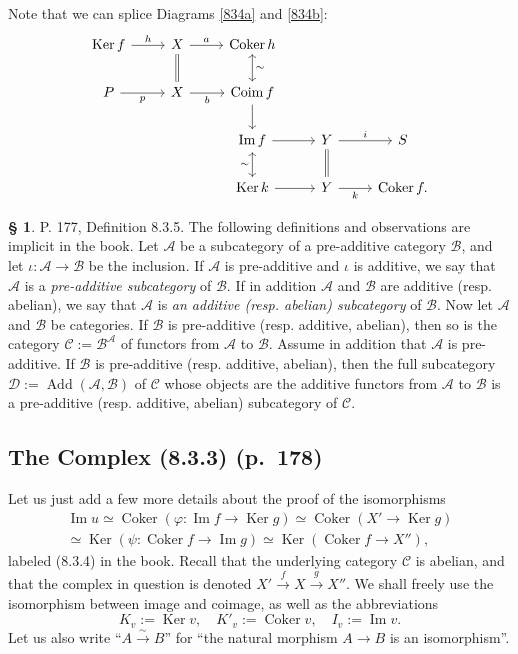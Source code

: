 \documentclass[12pt]{article}
\theoremstyle{remark}
\theoremstyle{definition}
\newtheorem{s}[thm]{\S}
\newcommand{\cc}{\mathcal}
\newcommand{\C}{\mathcal C}
\DeclareMathOperator{\Ad}{Add}
\DeclareMathOperator{\Coim}{Coim}
\DeclareMathOperator{\Coker}{Coker}
\DeclareMathOperator{\Ima}{Im}
\DeclareMathOperator{\Ker}{Ker}
\begin{document}
Note that we can splice Diagrams \eqref{834a} and \eqref{834b}:
$$
\begin{tikzcd}
\Ker f\ar{r}{h}&X\ar[equal]{d}\ar{r}{a}&\Coker h\ar[leftrightarrow]{d}{\sim}\\ 
P\ar{r}[swap]{p}&X\ar{r}[swap]{b}&\Coim f\ar{d}\\ 
{}&{}&\Ima f\ar[leftrightarrow]{d}[swap]{\sim}\ar{r}&Y\ar[equal]{d}\ar{r}{i}&S\\ 
{}&{}&\Ker k\ar{r}&Y\ar{r}[swap]{k}&\Coker f.
\end{tikzcd}
$$
%
%
\begin{s} 
P. 177, Definition 8.3.5. The following definitions and observations are implicit in the book. Let $\cc A$ be a subcategory of a pre-additive category $\cc B$, and let $\iota:\cc A\to \cc B$ be the inclusion. If $\cc A$ is pre-additive and $\iota$ is additive, we say that $\cc A$ is a {\em pre-additive subcategory} of $\cc B$. If in addition $\cc A$ and $\cc B$ are additive (resp. abelian), we say that $\cc A$ is {\em an additive (resp. abelian) subcategory} of $\cc B$. Now let $\cc A$ and $\cc B$ be categories. If $\cc B$ is pre-additive (resp. additive, abelian), then so is the category $\cc C:=\cc B^\cc A$ of functors from $\cc A$ to $\cc B$. Assume in addition that $\cc A$ is pre-additive. If $\cc B$ is pre-additive (resp. additive, abelian), then the full subcategory $\cc D:=\Ad(\cc A,\cc B)$ of $\cc C$ whose objects are the additive functors from $\cc A$ to $\cc B$ is a pre-additive (resp. additive, abelian) subcategory of $\cc C$.
\end{s}
%
\subsection{The Complex (8.3.3) (p.~178)}
%
Let us just add a few more details about the proof of the isomorphisms
\begin{equation}\label{834}
\begin{split}
\Ima u\simeq\Coker(\varphi:\Ima f\to\Ker g)\simeq\Coker(X'\to\Ker g)\\ 
\simeq\Ker(\psi:\Coker f\to\Ima g)\simeq\Ker(\Coker f\to X''),
\end{split}
\end{equation}
labeled (8.3.4) in the book. Recall that the underlying category $\C$ is abelian, and that the complex in question is denoted $X'\xrightarrow{f}X\xrightarrow{g}X''$. We shall freely use the isomorphism between image and coimage, as well as the abbreviations 
$$
K_v:=\Ker v,\quad K'_v:=\Coker v,\quad I_v:=\Ima v.
$$ 
Let us also write ``$A\overset{\sim}{\to}B$'' for ``the natural morphism $A\to B$ is an isomorphism''. 
\end{document}
